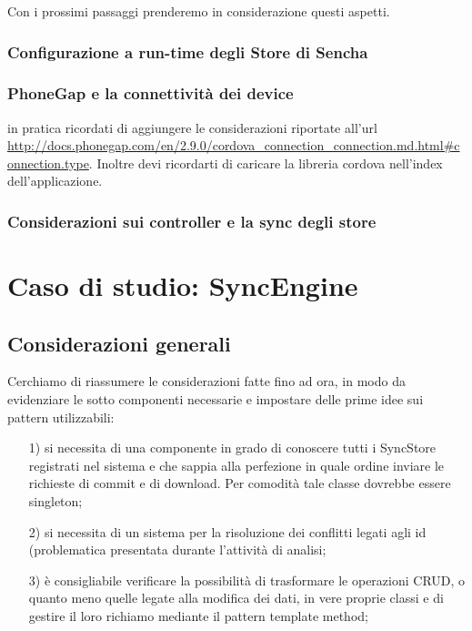 \documentclass[10pt,a4paper,onecolumn]{article}
\begin{document}
Con i prossimi passaggi prenderemo in considerazione questi aspetti.

\subsubsection{Configurazione a run-time degli Store di Sencha}

\subsubsection{PhoneGap e la connettività dei device}

in pratica ricordati di aggiungere le considerazioni riportate all'url \url{http://docs.phonegap.com/en/2.9.0/cordova_connection_connection.md.html#connection.type}. Inoltre devi ricordarti di caricare la libreria cordova nell'index dell'applicazione.

\subsubsection{Considerazioni sui controller e la sync degli store}

\clearpage

\section{Caso di studio: SyncEngine}

\subsection{Considerazioni generali}

Cerchiamo di riassumere le considerazioni fatte fino ad ora, in modo da evidenziare le sotto componenti necessarie e impostare delle prime idee sui pattern utilizzabili:
\begin{itemize}
	\item[1)] si necessita di una componente in grado di conoscere tutti i SyncStore registrati nel sistema e che sappia alla perfezione in quale ordine inviare le richieste di commit e di download. Per comodità tale classe dovrebbe essere singleton;
	\item[2)] si necessita di un sistema per la risoluzione dei conflitti legati agli id (problematica presentata durante l'attività di analisi;
	\item[3)] è consigliabile verificare la possibilità di trasformare le operazioni CRUD, o quanto meno quelle legate alla modifica dei dati, in vere proprie classi e di gestire il loro richiamo mediante il pattern template method;
\end{itemize}
\end{document}
